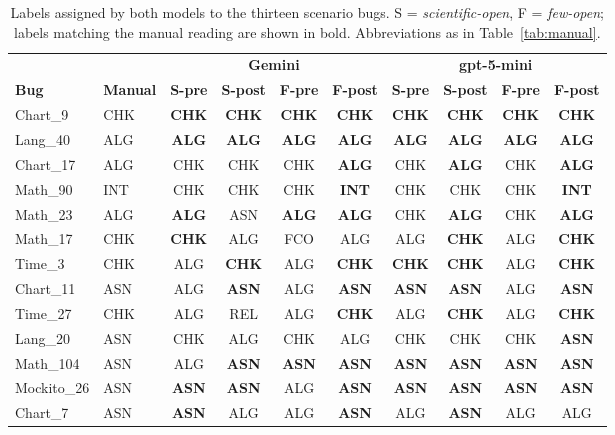 \documentclass{iutbscthesis}
\begin{document}
\begin{table}[!htbp]
    \centering
    \small
    \setlength{\tabcolsep}{4pt}
    \begin{tabular}{l l cccc cccc}
        \toprule
        & & \multicolumn{4}{c}{\textbf{Gemini}} & \multicolumn{4}{c}{\textbf{gpt-5-mini}} \\
        \cmidrule(lr){3-6} \cmidrule(lr){7-10}
        \textbf{Bug} & \textbf{Manual} & \textbf{S-pre} & \textbf{S-post} & \textbf{F-pre} & \textbf{F-post} & \textbf{S-pre} & \textbf{S-post} & \textbf{F-pre} & \textbf{F-post} \\
        \midrule
        Chart\_9 & CHK & \textbf{CHK} & \textbf{CHK} & \textbf{CHK} & \textbf{CHK} & \textbf{CHK} & \textbf{CHK} & \textbf{CHK} & \textbf{CHK} \\
        Lang\_40 & ALG & \textbf{ALG} & \textbf{ALG} & \textbf{ALG} & \textbf{ALG} & \textbf{ALG} & \textbf{ALG} & \textbf{ALG} & \textbf{ALG} \\
        Chart\_17 & ALG & CHK & CHK & CHK & \textbf{ALG} & CHK & \textbf{ALG} & CHK & \textbf{ALG} \\
        Math\_90 & INT & CHK & CHK & CHK & \textbf{INT} & CHK & CHK & CHK & \textbf{INT} \\
        Math\_23 & ALG & \textbf{ALG} & ASN & \textbf{ALG} & \textbf{ALG} & CHK & \textbf{ALG} & CHK & \textbf{ALG} \\
        Math\_17 & CHK & \textbf{CHK} & ALG & FCO & ALG & ALG & \textbf{CHK} & ALG & \textbf{CHK} \\
        Time\_3 & CHK & ALG & \textbf{CHK} & ALG & \textbf{CHK} & \textbf{CHK} & \textbf{CHK} & ALG & \textbf{CHK} \\
        Chart\_11 & ASN & ALG & \textbf{ASN} & ALG & \textbf{ASN} & \textbf{ASN} & \textbf{ASN} & ALG & \textbf{ASN} \\
        Time\_27 & CHK & ALG & REL & ALG & \textbf{CHK} & ALG & \textbf{CHK} & ALG & \textbf{CHK} \\
        Lang\_20 & ASN & CHK & ALG & CHK & ALG & CHK & CHK & CHK & \textbf{ASN} \\
        Math\_104 & ASN & ALG & \textbf{ASN} & \textbf{ASN} & \textbf{ASN} & \textbf{ASN} & \textbf{ASN} & \textbf{ASN} & \textbf{ASN} \\
        Mockito\_26 & ASN & \textbf{ASN} & \textbf{ASN} & ALG & \textbf{ASN} & \textbf{ASN} & \textbf{ASN} & \textbf{ASN} & \textbf{ASN} \\
        Chart\_7 & ASN & \textbf{ASN} & ALG & ALG & \textbf{ASN} & ALG & \textbf{ASN} & ALG & ALG \\
        \bottomrule
    \end{tabular}
    \caption{Labels assigned by both models to the thirteen scenario bugs. S = \textit{scientific-open}, F = \textit{few-open}; labels matching the manual reading are shown in bold. Abbreviations as in Table~\ref{tab:manual}.}
    \label{tab:crossmodel_labels}
\end{table}
\end{document}
